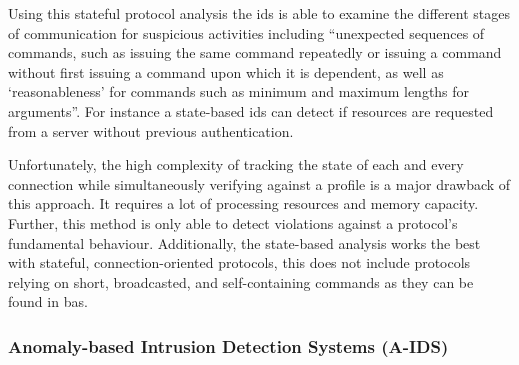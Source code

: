 Using this stateful protocol analysis the \gls{ids} is able to examine the different stages of communication for suspicious activities including \enquote{unexpected sequences of commands, such as issuing the same command repeatedly or issuing a command without first issuing a command upon which it is dependent, as well as \enquote{reasonableness} for commands such as minimum and maximum lengths for arguments}. \parencite{Scarfone2007}
For instance a state-based \gls{ids} can detect if resources are requested from a server without previous authentication. \parencite[p.~306]{Whitman2009}

Unfortunately, the high complexity of tracking the state of each and every connection while simultaneously verifying against a profile is a major drawback of this approach. It requires a lot of processing resources and memory capacity.
Further, this method is only able to detect violations against a protocol's fundamental behaviour.
Additionally, the state-based analysis works the best with stateful, connection-oriented protocols, this does not include protocols relying on short, broadcasted, and self-containing commands as they can be found in \gls{bas}. \parencite[p.~306]{Whitman2009}
	
\subsubsection{Anomaly-based Intrusion Detection Systems (A-IDS)}
\label{sec:background:network:ids:anomaly}
	
